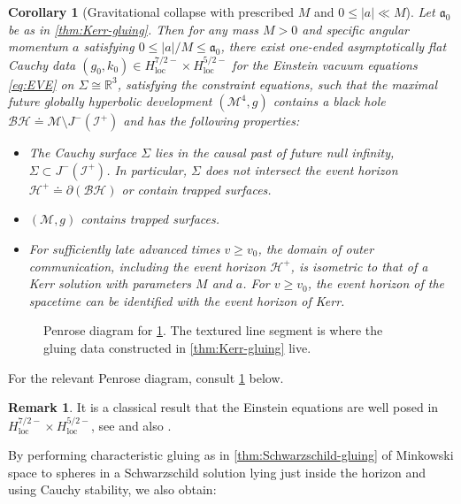 \documentclass[10pt]{article}
\numberwithin{equation}{section}
\theoremstyle{plain}
\newtheorem{cor}{Corollary}
\theoremstyle{definition}
\newtheorem{rk}{Remark}[section]
\renewcommand{\Bbb}{\mathbb}
\begin{document}
\begin{cor}[Gravitational collapse with prescribed $M$ and $0\le |a|\ll M$]\label{cor:main}
   Let $\mathfrak a_0$ be as in \cref{thm:Kerr-gluing}. Then for any mass $M>0$ and specific angular momentum $a$ satisfying $0\le|a|/ M\le\mathfrak a_0$, there exist one-ended asymptotically flat Cauchy data $(g_0,k_0)\in H^{7/2-}_\mathrm{loc}\times H^{5/2-}_\mathrm{loc}$ for the Einstein vacuum equations \eqref{eq:EVE} on $\Sigma\cong\Bbb R^3$, satisfying the constraint equations, such that the maximal future globally hyperbolic development $(\mathcal M^4,g)$ contains a black hole $\mathcal{BH}\doteq \mathcal M\setminus J^-(\mathcal I^+)$ and has the following properties: 
 \begin{itemize}
     \item The Cauchy surface $\Sigma$ lies in the causal past of future null infinity, $\Sigma\subset J^-(\mathcal I^+)$. In particular, $\Sigma$ does not intersect the event horizon $\mathcal H^+\doteq\partial(\mathcal{BH})$ or contain trapped surfaces. 
      \item $(\mathcal M,g)$ contains trapped surfaces. 
     \item For sufficiently late advanced times $v\ge v_0$, the domain of outer communication, including the event horizon $\mathcal H^+$, is isometric to that of a Kerr solution with parameters $M$ and $a$. For $v\ge v_0$, the event horizon of the spacetime can be identified with the event horizon of Kerr. 
 \end{itemize}
\end{cor}

 \begin{figure}[ht]
\centering{
\def\svgwidth{20pc}
}
\caption{Penrose diagram for \cref{cor:main}. The textured line segment is where the gluing data constructed in \cref{thm:Kerr-gluing} live.}
\label{main-corollary-diagram}
\end{figure}

For the relevant Penrose diagram, consult \cref{main-corollary-diagram} below. 

\begin{rk}
    It is a classical result that the Einstein equations are well posed in $H^{7/2-}_\mathrm{loc}\times H^{5/2-}_\mathrm{loc}$, see \cite{HKM} and also \cite{Planchon-Rodnianski, C-low-reg}. 
\end{rk}

By performing characteristic gluing as in \cref{thm:Schwarzschild-gluing} of Minkowski space to spheres in a Schwarzschild solution lying just inside the horizon and using Cauchy stability, we also obtain:
\end{document}
